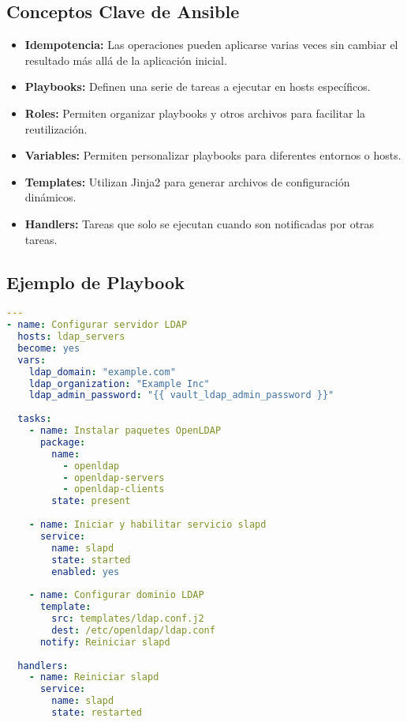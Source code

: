\documentclass[12pt,a4paper]{report}
\begin{document}
\subsection{Conceptos Clave de Ansible}

\begin{tcolorbox}[
  enhanced,
  colback=white,
  colframe=cientigo-blue,
  arc=0mm,
  boxrule=1pt,
  title=Conceptos Clave de Ansible,
  attach boxed title to top center={yshift=-\tcboxedtitleheight/2},
  boxed title style={
    colback=cientigo-blue,
    colframe=cientigo-blue,
    fontupper=\bfseries\color{white},
  },
  coltitle=white,
  fonttitle=\bfseries
]
\begin{itemize}
    \item \textbf{Idempotencia:} Las operaciones pueden aplicarse varias veces sin cambiar el resultado más allá de la aplicación inicial.
    \item \textbf{Playbooks:} Definen una serie de tareas a ejecutar en hosts específicos.
    \item \textbf{Roles:} Permiten organizar playbooks y otros archivos para facilitar la reutilización.
    \item \textbf{Variables:} Permiten personalizar playbooks para diferentes entornos o hosts.
    \item \textbf{Templates:} Utilizan Jinja2 para generar archivos de configuración dinámicos.
    \item \textbf{Handlers:} Tareas que solo se ejecutan cuando son notificadas por otras tareas.
\end{itemize}
\end{tcolorbox}

\subsection{Ejemplo de Playbook}

\begin{lstlisting}[language=yaml]
---
- name: Configurar servidor LDAP
  hosts: ldap_servers
  become: yes
  vars:
    ldap_domain: "example.com"
    ldap_organization: "Example Inc"
    ldap_admin_password: "{{ vault_ldap_admin_password }}"
  
  tasks:
    - name: Instalar paquetes OpenLDAP
      package:
        name:
          - openldap
          - openldap-servers
          - openldap-clients
        state: present
    
    - name: Iniciar y habilitar servicio slapd
      service:
        name: slapd
        state: started
        enabled: yes
    
    - name: Configurar dominio LDAP
      template:
        src: templates/ldap.conf.j2
        dest: /etc/openldap/ldap.conf
      notify: Reiniciar slapd
  
  handlers:
    - name: Reiniciar slapd
      service:
        name: slapd
        state: restarted
\end{lstlisting}
\end{document}
